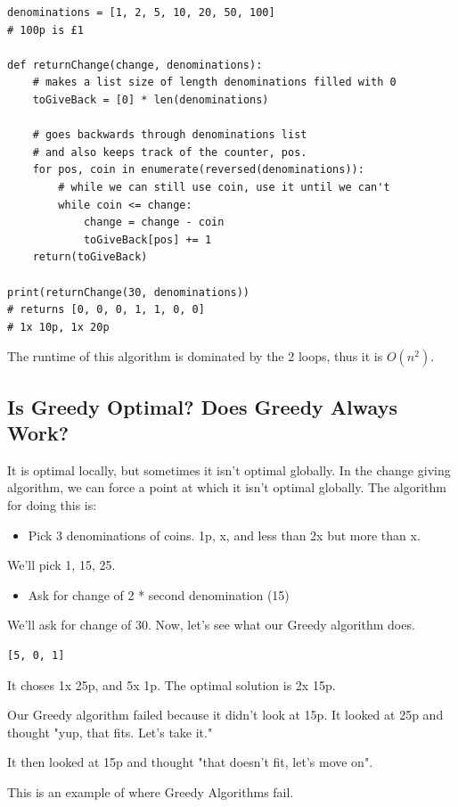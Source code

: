 \documentclass{article}
\begin{document}
 \begin{verbatim}
denominations = [1, 2, 5, 10, 20, 50, 100]
# 100p is £1

def returnChange(change, denominations):
	# makes a list size of length denominations filled with 0
	toGiveBack = [0] * len(denominations)

	# goes backwards through denominations list
	# and also keeps track of the counter, pos.
	for pos, coin in enumerate(reversed(denominations)):
		# while we can still use coin, use it until we can't
		while coin <= change:
			change = change - coin
			toGiveBack[pos] += 1
	return(toGiveBack)
			
print(returnChange(30, denominations))
# returns [0, 0, 0, 1, 1, 0, 0]
# 1x 10p, 1x 20p
\end{verbatim}
The runtime of this algorithm is dominated by the 2 loops, thus it is $O(n^2)$.
\newpage
\subsection{Is Greedy Optimal? Does Greedy Always Work?}
It is optimal locally, but sometimes it isn't optimal globally. In the change giving algorithm, we can force a point at which it isn't optimal globally. 
The algorithm for doing this is:
\begin{itemize}
    \item Pick 3 denominations of coins. 1p, x, and less than 2x but more than x.
\end{itemize}

We'll pick 1, 15, 25.
\begin{itemize}
    \item Ask for change of 2 * second denomination (15)
\end{itemize}

We'll ask for change of 30. Now, let's see what our Greedy algorithm does.
 \begin{verbatim}
[5, 0, 1]
\end{verbatim}
It choses 1x 25p, and 5x 1p. The optimal solution is 2x 15p. 

Our Greedy algorithm failed because it didn't look at 15p. It looked at 25p and thought "yup, that fits. Let's take it."

It then looked at 15p and thought "that doesn't fit, let's move on".

This is an example of where Greedy Algorithms fail.
\end{document}
